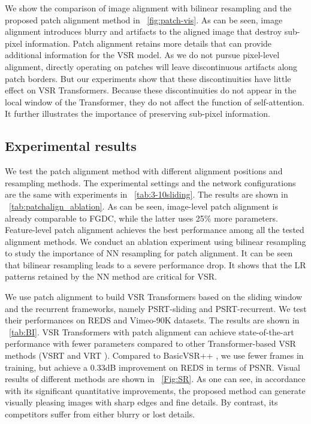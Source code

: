 \documentclass{article}
\begin{document}
We show the comparison of image alignment with bilinear resampling and the proposed patch alignment method in \figurename~\ref{fig:patch-vis}.
As can be seen, image alignment introduces blurry and artifacts to the aligned image that destroy sub-pixel information.
Patch alignment retains more details that can provide additional information for the VSR model.
As we do not pursue pixel-level alignment, directly operating on patches will leave discontinuous artifacts along patch borders. 
But our experiments show that these discontinuities have little effect on VSR Transformers.
Because these discontinuities do not appear in the local window of the Transformer, they do not affect the function of self-attention.
It further illustrates the importance of preserving sub-pixel information.


\vspace{-2mm}
\subsection{Experimental results}
\vspace{-2mm}
We test the patch alignment method with different alignment positions and resampling methods.
The experimental settings and the network configurations are the same with experiments in \tablename~\ref{tab:3-10sliding}.
The results are shown in \tablename~\ref{tab:patchalign_ablation}.
As can be seen, image-level patch alignment is already comparable to FGDC, while the latter uses 25\% more parameters.
Feature-level patch alignment achieves the best performance among all the tested alignment methods.
We conduct an ablation experiment using bilinear resampling to study the importance of NN resampling for patch alignment.
It can be seen that bilinear resampling leads to a severe performance drop.
It shows that the LR patterns retained by the NN method are critical for VSR.



We use patch alignment to build VSR Transformers based on the sliding window and the recurrent frameworks, namely PSRT-sliding and PSRT-recurrent.
We test their performances on REDS and Vimeo-90K datasets. The results are shown in \tablename~\ref{tab:BI}.
VSR Transformers with patch alignment can achieve state-of-the-art performance with fewer parameters compared to other Transformer-based VSR methods (VSRT \cite{cao2021video} and VRT \cite{liang2022vrt}).
Compared to BasicVSR++ \cite{chan2021basicvsr++}, we use fewer frames in training, but achieve a 0.33dB improvement on REDS in terms of PSNR.
Visual results of different methods are shown in \figurename~\ref{Fig:SR}.
As one can see, in accordance with its signiﬁcant quantitative improvements, the proposed method can generate visually pleasing images with sharp edges and ﬁne details.
By contrast, its competitors suffer from either blurry or lost details.
\end{document}
